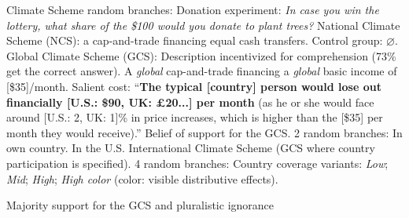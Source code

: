 \documentclass[aspectratio=169,xcolor=dvipsnames, 11pt,mathserif]{beamer}
\begin{document}
\begin{frame}{Climate Scheme\label{cs}} 
    \bbvsp {} random branches:
      \bbvsp \ip Donation experiment: \textit{In case you win the lottery, what share of the \$100 would you donate to plant trees?}
      \ip National Climate Scheme (NCS): a cap-and-trade financing equal cash transfers.
      \ip Control group: $\varnothing$. \ee
    \ip Global Climate Scheme (GCS): \hyperlink{gcs_question}{} 
      \bbvsp \ip Description incentivized for comprehension (73\% get the correct answer). %
      \ip A \textit{global} cap-and-trade financing a \textit{global} basic income of [\$35]/month.
      \ip Salient cost: ``\textbf{The typical [country] person would lose out financially [U.S.: \$90, UK: £20...] per month} (as he or she would face around [U.S.: 2, UK: 1]\% in price increases, which is higher than the [\$35] per month they would receive).'' \ee
    \ip Belief of support for the GCS. 2 random branches:
      \bbvs \ip In own country.
      \ip In the U.S. \ee
    \ip International Climate Scheme (GCS where country participation is specified). 4 random branches:
    \bbvs \ip  Country coverage variants: \textit{Low}; \textit{Mid}; \textit{High}; \textit{High color} (color: visible distributive effects). \ee
    \ee
\end{frame}

\begin{frame}{Majority support for the GCS and pluralistic ignorance}
\end{frame}
\end{document}
